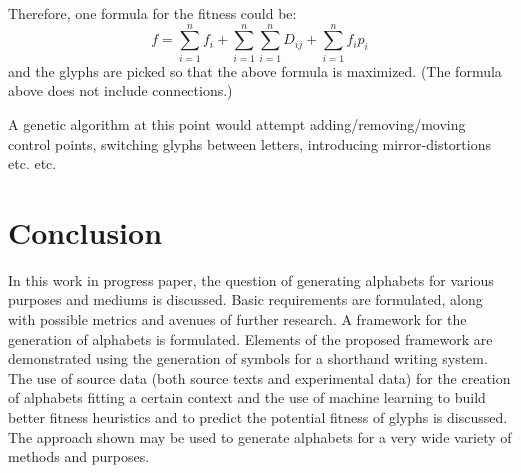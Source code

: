 \documentclass[conference]{IEEEtran}
\begin{document}
Therefore, one formula for the fitness could be:
\[
f=\sum^{n}_{i=1}f_i+
\sum^{n}_{i=1}\sum^{n}_{i=1}D_{ij}+
\sum^{n}_{i=1}f_ip_i
\]
and the glyphs are picked so that the above formula is maximized. (The formula above does not include connections.)

A genetic algorithm at this point would attempt adding/removing/moving control points, switching glyphs between letters, introducing mirror-distortions etc. etc.


\section{Conclusion}
In this work in progress paper, the question of generating alphabets for various purposes and mediums is discussed. Basic requirements are formulated, along with possible metrics and avenues of further research. A framework for the generation of alphabets is formulated. Elements of the proposed framework are demonstrated using the generation of symbols for a shorthand writing system. The use of source data (both source texts and experimental data) for the creation of alphabets fitting a
certain context and the use of machine learning to build better fitness heuristics and to predict the potential fitness of glyphs is discussed. The approach shown may be used to generate alphabets for a very wide variety of methods and purposes.


\end{document}
